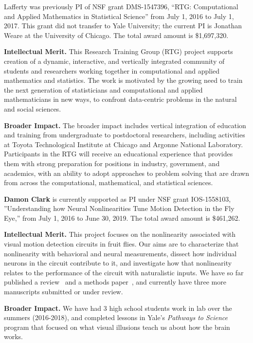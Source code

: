 \vskip10pt \noindent Lafferty was previously PI of NSF grant
DMS-1547396, ``RTG: Computational and Applied Mathematics in
Statistical Science'' from July 1, 2016 to July 1, 2017. This grant
did not transfer to Yale University; the current PI is Jonathan Weare
at the University of Chicago. The total award amount is \$1,697,320.

{\bf Intellectual Merit.}  This Research Training Group (RTG) project
supports creation of a dynamic, interactive, and vertically integrated
community of students and researchers working together in
computational and applied mathematics and statistics. The work is
motivated by the growing need to train the next generation of
statisticians and computational and applied mathematicians in new
ways, to confront data-centric problems in the natural and social
sciences.

{\bf Broader Impact.} The broader impact includes vertical integration
of education and training from undergraduate to postdoctoral
researchers, including activities at Toyota Technological Institute at
Chicago and Argonne National Laboratory. Participants in the RTG will
receive an educational experience that provides them with strong
preparation for positions in industry, government, and academics, with
an ability to adopt approaches to problem solving that are drawn from
across the computational, mathematical, and statistical sciences.

\vskip10pt \textbf{Damon Clark} is currently supported as PI under NSF
grant IOS-1558103, ''Understanding how Neural Nonlinearities Tune
Motion Detection in the Fly Eye,'' from July 1, 2016 to June 30, 2019.
The total award amount is \$461,262.

{\bf Intellectual Merit.} This project focuses on the nonlinearity
associated with visual motion detection circuits in fruit flies. Our
aims are to characterize that nonlinearity with behavioral and neural
measurements, dissect how individual neurons in the circuit contribute
to it, and investigate how that nonlinearity relates to the
performance of the circuit with naturalistic inputs. We have so far
published a review~\citep{clark:16} and a methods
paper~\citep{mano:17}, and currently have three more manuscripts
submitted or under review.

{\bf Broader Impact.} We have had 3 high school students work in lab
over the summers (2016-2018), and completed lessons in Yale's
\textit{Pathways to Science} program that focused on what visual
illusions teach us about how the brain works.
